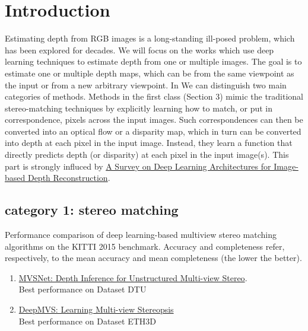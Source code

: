 \section{Introduction}
\label{ch:intro deep learning}

Estimating depth from RGB images is a long-standing ill-posed problem, which has been explored for decades. We will focus on the works which use deep learning techniques to estimate depth from one or multiple images. The goal is to estimate one or multiple depth maps, which can be from the same viewpoint as the input or from a new arbitrary viewpoint. In We can distinguish two main categories of methods. Methods in the first class (Section 3) mimic the traditional stereo-matching techniques by explicitly learning how to match, or put in correspondence, pixels across the input images. Such correspondences can then be converted into an optical flow or a disparity map, which in turn can be converted into depth at each pixel in the input image.  Instead, they learn a function that directly predicts depth (or disparity) at each pixel in the input image(s). This part is strongly influced by \href{https://arxiv.org/abs/1906.06113}{A Survey on Deep Learning Architectures for Image-based Depth Reconstruction}.

\subsection{category 1: stereo matching}
\label{stereo matching networks}
Performance comparison of deep learning-based multiview stereo matching algorithms on the KITTI 2015 benchmark. Accuracy and completeness refer, respectively, to the mean accuracy and mean completeness (the lower the better).
\begin{enumerate}
    \item  \href{https://arxiv.org/abs/1804.02505}{MVSNet: Depth Inference for Unstructured Multi-view Stereo}. \\
    Best performance on Dataset DTU\\
    \item   \href{https://arxiv.org/abs/1804.00650}{DeepMVS: Learning Multi-view Stereopsis}\\
    Best performance on Dataset ETH3D\\
\end{enumerate}




